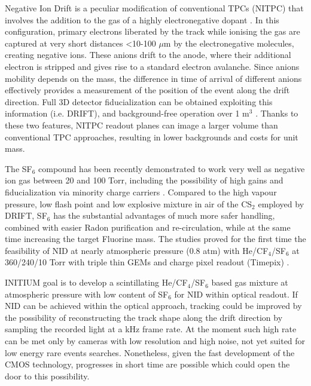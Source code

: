 \documentclass[physics,article,submit,moreauthors,pdftex]{Definitions/mdpi}
\begin{document}
Negative Ion Drift is a peculiar modification of conventional TPCs (NITPC) that involves the addition to the gas of a highly electronegative dopant \cite{Martoff:2000wi, Ohnuki:2000ex}. In this configuration, primary electrons liberated by the track while ionising the gas are captured at very short distances <10-100 $\mu$m by the electronegative molecules, creating negative ions. These anions drift to the anode, where their additional electron is stripped and gives rise to a standard electron avalanche. 
Since anions mobility depends on the mass, the difference in time of arrival of different anions effectively provides a measurement of the position of the event along the drift direction. Full 3D detector fiducialization can be obtained exploiting this information (i.e. DRIFT), and background-free operation over 1 m$^3$ \cite{Battat:2016xxe}. Thanks to these two features, NITPC readout planes can image a larger volume than conventional TPC approaches, resulting in lower backgrounds and costs for unit mass.

The SF$_6$ compound has been recently demonstrated to work very well as negative ion gas between 20 and 100 Torr, including the possibility of high gains and fiducialization via minority charge carriers \cite{Phan:2016veo, Ikeda:2020pex, Lightfoot:2007zz}. Compared to the high vapour pressure, low flash point and low explosive mixture in air of the CS$_2$ employed by DRIFT, SF$_6$ has the substantial advantages of much more safer handling, combined with easier Radon purification and re-circulation, while at the same time increasing the target Fluorine mass. The studies proved for the first time the feasibility of NID at nearly atmospheric pressure (0.8 atm) with He/CF$_4$/SF$_6$ at 360/240/10 Torr with triple thin GEMs and charge pixel readout (Timepix) \cite{Baracchini:2017ysg}.

INITIUM goal is to develop a scintillating He/CF$_4$/SF$_6$ based gas mixture at atmospheric pressure with low content of SF$_6$ for NID within optical readout. If NID can be achieved within the optical approach, tracking could be improved by the possibility of reconstructing the track shape along the drift direction by sampling the recorded light at a kHz frame rate. At the moment such high rate can be met only by cameras with low resolution and high noise, not yet suited for low energy rare events searches. Nonetheless, given the fast development of the CMOS technology, progresses in short time are possible which could open the door to this possibility.
\end{document}
